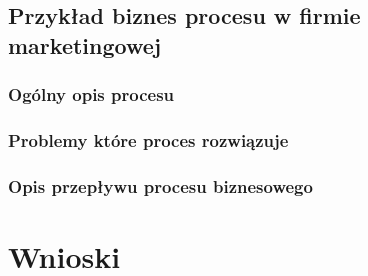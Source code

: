 \documentclass[a4paper, 12pt]{article}
\begin{document}
\subsection{Przykład biznes procesu w firmie marketingowej}
\subsubsection{Ogólny opis procesu}
\subsubsection{Problemy które proces rozwiązuje}
\subsubsection{Opis przepływu procesu biznesowego}

\section{Wnioski} 


\label{LastPage}~
\label{LastPageOfBackMatter}~		
\end{document}

